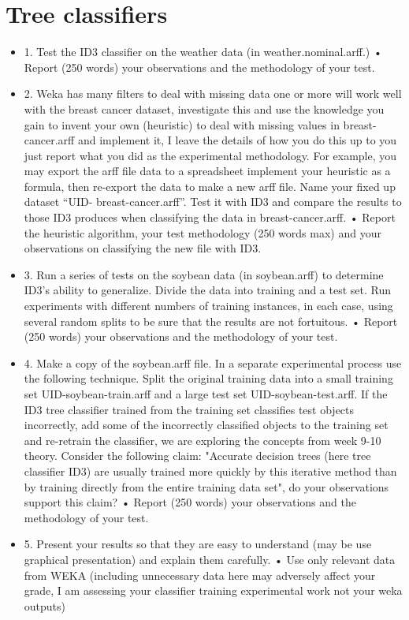 \documentclass[12pt]{article} %
\begin{document}
\section*{Tree classifiers}
\begin{itemize}
\item 1.	Test the ID3 classifier on the weather data (in weather.nominal.arff.) 
\subitem •	Report (250 words) your observations and the methodology of your test. 
\item 2.	Weka has many filters to deal with missing data one or more will work well with the breast cancer dataset, investigate this and use the knowledge you gain to invent your own (heuristic) to deal with missing values in breast-cancer.arff and implement it, I leave the details of how you do this up to you just report what you did as the experimental methodology. For example, you may export the arff file data to a spreadsheet implement your heuristic as a formula, then re-export the data to make a new arff file. Name your fixed up dataset “UID- breast-cancer.arff”. Test it with ID3 and compare the results to those ID3 produces when classifying the data in breast-cancer.arff. 
\subitem •	Report the heuristic algorithm, your test methodology (250 words max) and your observations on classifying the new file with ID3.  
\item 3.	Run a series of tests on the soybean data (in soybean.arff) to determine ID3's ability to generalize. Divide the data into training and a test set. Run experiments with different numbers of training instances, in each case, using several random splits to be sure that the results are not fortuitous. 
\subitem •	Report (250 words) your observations and the methodology of your test.
\item 4.	Make a copy of the soybean.arff file. In a separate experimental process use the following technique. Split the original training data into a small training set UID-soybean-train.arff and a large test set UID-soybean-test.arff. If the ID3 tree classifier trained from the training set classifies test objects incorrectly, add some of the incorrectly classified objects to the training set and re-retrain the classifier, we are exploring the concepts from week 9-10 theory. Consider the following claim: "Accurate decision trees (here tree classifier ID3) are usually trained more quickly by this iterative method than by training directly from the entire training data set", do your observations support this claim?  
\subitem •	Report (250 words) your observations and the methodology of your test.
\item 5.	Present your results so that they are easy to understand (may be use graphical presentation) and explain them carefully. 
\subitem •	Use only relevant data from WEKA (including unnecessary data here may adversely affect your grade, I am assessing your classifier training experimental work not your weka outputs)
\end{itemize}
\end{document}
